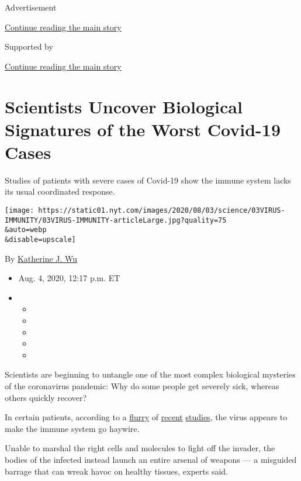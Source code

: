 Advertisement

\protect\hyperlink{after-top}{Continue reading the main story}

Supported by

\protect\hyperlink{after-sponsor}{Continue reading the main story}

\hypertarget{scientists-uncover-biological-signatures-of-the-worst-covid-19-cases}{%
\section{Scientists Uncover Biological Signatures of the Worst Covid-19
Cases}\label{scientists-uncover-biological-signatures-of-the-worst-covid-19-cases}}

Studies of patients with severe cases of Covid-19 show the immune system
lacks its usual coordinated response.

\texttt{[image: https://static01.nyt.com/images/2020/08/03/science/03VIRUS-IMMUNITY/03VIRUS-IMMUNITY-articleLarge.jpg?quality=75\\\&auto=webp\\\&disable=upscale]}

By \href{https://www.nytimes.com/by/katherine-j--wu}{Katherine J. Wu}

\begin{itemize}
\item
  Aug. 4, 2020, 12:17 p.m. ET
\item
  \begin{itemize}
  \item
  \item
  \item
  \item
  \item
  \end{itemize}
\end{itemize}

Scientists are beginning to untangle one of the most complex biological
mysteries of the coronavirus pandemic: Why do some people get severely
sick, whereas others quickly recover?

In certain patients, according to a
\href{https://www.nature.com/articles/s41586-020-2588-y}{flurry} of
\href{https://science.sciencemag.org/content/early/2020/07/15/science.abc8511}{recent}
\href{https://immunology.sciencemag.org/content/5/49/eabd7114}{studies},
the virus appears to make the immune system go haywire.

Unable to marshal the right cells and molecules to fight off the
invader, the bodies of the infected instead launch an entire arsenal of
weapons --- a misguided barrage that can wreak havoc on healthy tissues,
experts said.

